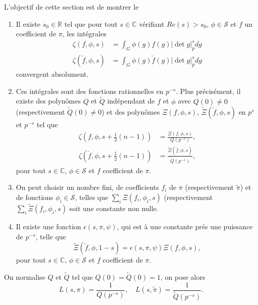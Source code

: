 L'objectif de cette section est de montrer le
\begin{theoreme}
\label{thm_padique}
\begin{enumerate}
\item Il existe $s_0 \in \mathbb{R}$ tel que pour tout $s \in \mathbb{C}$ vérifiant $Re (s) > s_0$, $\phi \in \mathcal{S}$ et $f$ un coefficient de $\pi$, les intégrales
\begin{align}
\zeta(f, \phi, s) &= \int_G \phi(g)f(g)|\det g|_p^s dg \\
\zeta(\check{f}, \phi, s) &= \int_G \phi(g)\check{f}(g)|\det g|_p^s dg
\end{align}
convergent absolument.
\item Ces intégrales sont des fonctions rationnelles en $p^{-s}$. Plus précisément, il existe des polynômes $Q$ et $\tilde{Q}$ indépendant de $f$ et $\phi$ avec $Q(0)\neq 0$ (respectivement $\tilde{Q}(0)\neq 0$) et des polynômes $\Xi(f, \phi, s)$, $\tilde{\Xi}(\check{f}, \phi, s)$ en $p^{s}$ et $p^{-s}$ tel que
\begin{align}
\zeta(f, \phi, s+\frac{1}{2}(n-1)) &= \frac{\Xi(f, \phi, s)}{Q(p^{-s})}, \\
\zeta(\check{f}, \phi, s+\frac{1}{2}(n-1)) &= \frac{\tilde{\Xi}(\check{f}, \phi, s)}{\tilde{Q}(p^{-s})},
\end{align}
pour tout $s \in \mathbb{C}$, $\phi \in \mathcal{S}$ et $f$ coefficient de $\pi$.
\item On peut choisir un nombre fini, de coefficients $f_i$ de $\pi$ (respectivement $\tilde{\pi}$) et de fonctions $\phi_i \in \mathcal{S}$, telles que $\sum_i \Xi(f_i, \phi_i, s)$ (respectivement $\sum_i \tilde{\Xi}(f_i, \phi_i, s)$ soit une constante non nulle.
\item Il existe une fonction $\epsilon(s, \pi, \psi)$, qui est à une constante prés une puissance de $p^{-s}$, telle que
\begin{equation}
\label{epsilon}
\tilde{\Xi}(\check{f}, \hat{\phi}, 1-s) = \epsilon(s, \pi, \psi)\Xi(f, \phi, s),
\end{equation}
pour tout $s\in \mathbb{C}$, $\phi \in \mathcal{S}$ et $f$ coefficient de $\pi$.
\end{enumerate}
\end{theoreme}

On normalise $Q$ et $\tilde{Q}$ tel que $Q(0)=\tilde{Q}(0)=1$, on pose alors
\begin{equation}
L(s, \pi) = \frac{1}{Q(p^{-s})}, \quad L(s, \tilde{\pi}) = \frac{1}{\tilde{Q}(p^{-s})}.
\end{equation}

